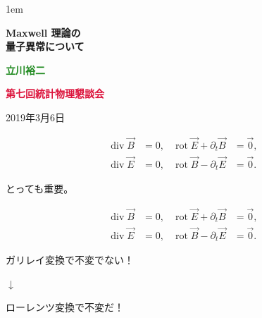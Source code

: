 \documentclass[xcolor={svgnames,rgb}]{beamer}
\date[]{}
\def\bff{\ifmmode\else\bfseries\fi}
\def\red#1{\textcolor{Crimson}{\bff #1}}
\def\green#1{\textcolor{ForestGreen}{\bff #1}}
\def\alert#1{\red{#1}}
\begin{document}
\parskip1em 
\boldmath
\def\baselinestretch{1.1}



\def\incb#1{\vcenter{\hbox{\texttt{[image: \#1]}}}}
\def\inc#1{\vcenter{\hbox{\texttt{[image: \#1]}}}}
\def\incc#1{\vcenter{\hbox{\texttt{[image: \#1]}}}}

\begin{frame}
\bigskip\bigskip\bigskip\bigskip\bigskip

\vfill


\begin{exampleblock}{}
\begin{center}\LARGE\bfseries
\color{math}
Maxwell 理論の\\
量子異常について
\end{center}
\end{exampleblock}

\bigskip\bigskip\bigskip
\begin{center}
\large  \green{立川裕二}  

\bigskip
\large \alert{第七回統計物理懇談会}

\bigskip
\large 2019年3月6日
\end{center}
\bigskip\bigskip\bigskip
\vfill


\end{frame}



\def\div{\mathop{\mathrm{div}}}
\def\rot{\mathop{\mathrm{rot}}}
\begin{frame}
\LARGE
\begin{align*}
\div \vec B&=0,  &\rot \vec E + \partial_t \vec B&=\vec 0, \\
\div \vec E&=0, & \rot \vec B - \partial_t \vec E&=\vec 0.
\end{align*}
\begin{center}

\bigskip\bigskip

とっても重要。
\end{center}

\end{frame}

\begin{frame}
\LARGE
\begin{align*}
\div \vec B&=0,  &\rot \vec E + \partial_t \vec B&=\vec 0, \\
\div \vec E&=0, & \rot \vec B - \partial_t \vec E&=\vec 0.
\end{align*}
\begin{center}
ガリレイ変換で不変でない！ 

$\downarrow$

ローレンツ変換で不変だ！
\end{center}

\end{frame}
\end{document}
